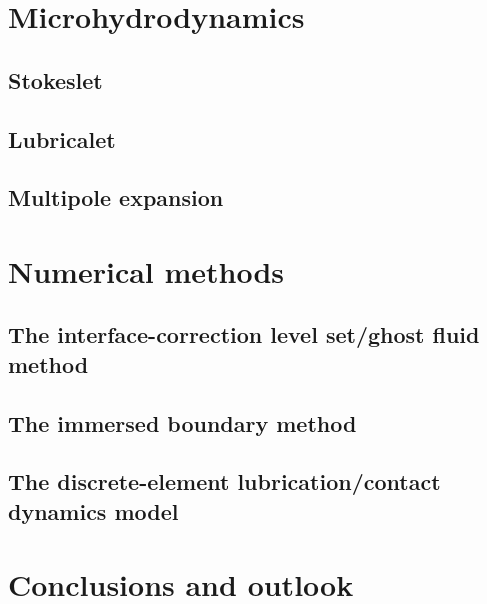 \chapter{Microhydrodynamics}


\section{Stokeslet}

\section{Lubricalet}

\section{Multipole expansion}




\chapter{Numerical methods}
%
\section{The interface-correction level set/ghost fluid method}

\section{The immersed boundary method}

\section{The discrete-element lubrication/contact dynamics model}

\chapter{Conclusions and outlook}
%


